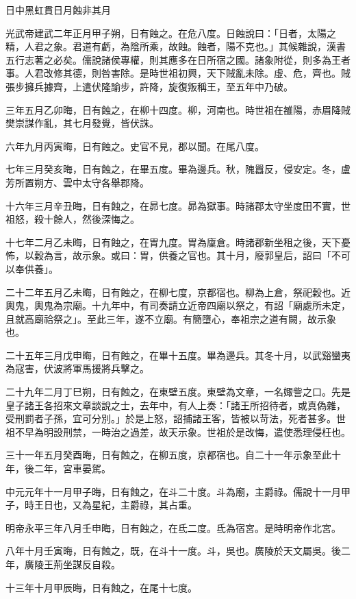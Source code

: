 
\begin{pinyinscope}
日中黑虹貫日月蝕非其月

光武帝建武二年正月甲子朔，日有蝕之。在危八度。日蝕說曰：「日者，太陽之精，人君之象。君道有虧，為陰所乘，故蝕。蝕者，陽不克也。」其候雜說，漢書五行志著之必矣。儒說諸侯專權，則其應多在日所宿之國。諸象附從，則多為王者事。人君改修其德，則咎害除。是時世祖初興，天下賊亂未除。虛、危，齊也。賊張步擁兵據齊，上遣伏隆諭步，許降，旋復叛稱王，至五年中乃破。

三年五月乙卯晦，日有蝕之，在柳十四度。柳，河南也。時世祖在雒陽，赤眉降賊樊崇謀作亂，其七月發覺，皆伏誅。

六年九月丙寅晦，日有蝕之。史官不見，郡以聞。在尾八度。

七年三月癸亥晦，日有蝕之，在畢五度。畢為邊兵。秋，隗囂反，侵安定。冬，盧芳所置朔方、雲中太守各舉郡降。

十六年三月辛丑晦，日有蝕之，在昴七度。昴為獄事。時諸郡太守坐度田不實，世祖怒，殺十餘人，然後深悔之。

十七年二月乙未晦，日有蝕之，在胃九度。胃為廩倉。時諸郡新坐租之後，天下憂怖，以穀為言，故示象。或曰：胃，供養之官也。其十月，廢郭皇后，詔曰「不可以奉供養」。

二十二年五月乙未晦，日有蝕之，在柳七度，京都宿也。柳為上倉，祭祀穀也。近輿鬼，輿鬼為宗廟。十九年中，有司奏請立近帝四廟以祭之，有詔「廟處所未定，且就高廟祫祭之」。至此三年，遂不立廟。有簡墮心，奉祖宗之道有闕，故示象也。

二十五年三月戊申晦，日有蝕之，在畢十五度。畢為邊兵。其冬十月，以武谿蠻夷為寇害，伏波將軍馬援將兵擊之。

二十九年二月丁巳朔，日有蝕之，在東壁五度。東壁為文章，一名娵訾之口。先是皇子諸王各招來文章談說之士，去年中，有人上奏：「諸王所招待者，或真偽雜，受刑罰者子孫，宜可分別。」於是上怒，詔捕諸王客，皆被以苛法，死者甚多。世祖不早為明設刑禁，一時治之過差，故天示象。世祖於是改悔，遣使悉理侵枉也。

三十一年五月癸酉晦，日有蝕之，在柳五度，京都宿也。自二十一年示象至此十年，後二年，宮車晏駕。

中元元年十一月甲子晦，日有蝕之，在斗二十度。斗為廟，主爵祿。儒說十一月甲子，時王日也，又為星紀，主爵祿，其占重。

明帝永平三年八月壬申晦，日有蝕之，在氐二度。氐為宿宮。是時明帝作北宮。

八年十月壬寅晦，日有蝕之，既，在斗十一度。斗，吳也。廣陵於天文屬吳。後二年，廣陵王荊坐謀反自殺。

十三年十月甲辰晦，日有蝕之，在尾十七度。


\end{pinyinscope}
